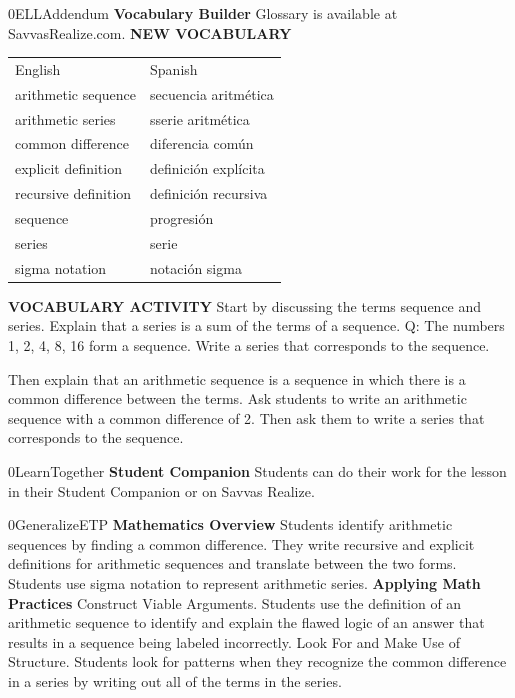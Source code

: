 \documentclass{article}
\newenvironment{te-addendum}[2]{}{}     %
\newcommand{\answer}[1]{}               %
\newcommand{\placeholder}[2]{}          %
\newcommand{\te}[1]{}                   %
\begin{document}
\begin{te-addendum}{0}{ELLAddendum}
\textbf{Vocabulary Builder}
Glossary is available at SavvasRealize.com.
\textbf{NEW VOCABULARY}
\begin{tabular}{ll}
English & Spanish \\
arithmetic sequence & secuencia aritmética \\
arithmetic series & sserie aritmética \\
common difference & diferencia común \\
explicit definition & definición explícita \\
recursive definition & definición recursiva \\
sequence & progresión \\
series & serie \\
sigma notation & notación sigma \\
\end{tabular}
\te{Printed sserie; likely serie.}
\textbf{VOCABULARY ACTIVITY}
Start by discussing the terms sequence and series. Explain that a series is a sum of the terms of a sequence.
Q: The numbers 1, 2, 4, 8, 16 form a sequence. Write a series that corresponds to the sequence.
\answer{(1+2+4+8+16)}
Then explain that an arithmetic sequence is a sequence in which there is a common difference between the terms.
Ask students to write an arithmetic sequence with a common difference of 2. Then ask them to write a series that corresponds to the sequence.
\end{te-addendum}
\begin{te-addendum}{0}{LearnTogether}
\textbf{Student Companion}
Students can do their work for the lesson in their Student Companion or on Savvas Realize.
\placeholder{illustration}{Student Companion enVision Algebra 2 cover, black background with purple, blue, and yellow swirling circular artwork.}
\end{te-addendum}
\begin{te-addendum}{0}{GeneralizeETP}
\textbf{Mathematics Overview}
Students identify arithmetic sequences by finding a common difference. They write recursive and explicit definitions for arithmetic sequences and translate between the two forms.
Students use sigma notation to represent arithmetic series.
\textbf{Applying Math Practices}
Construct Viable Arguments. Students use the definition of an arithmetic sequence to identify and explain the flawed logic of an answer that results in a sequence being labeled incorrectly.
Look For and Make Use of Structure. Students look for patterns when they recognize the common difference in a series by writing out all of the terms in the series.
\end{te-addendum}
\end{document}
